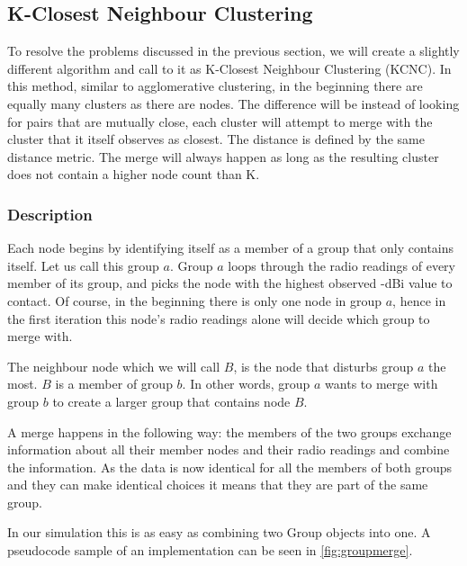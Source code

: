 \subsection{K-Closest Neighbour Clustering}
\label{chap:kcn}
To resolve the problems discussed in the previous section, we will create a slightly different algorithm and call to it as K-Closest Neighbour Clustering (KCNC). 
In this method, similar to agglomerative clustering, in the beginning there are equally many clusters as there are nodes. The difference will be instead of looking for pairs that are mutually close,
each cluster will attempt to merge with the cluster that it itself observes as closest. The distance is defined by the same distance metric. The merge will always happen as long as the resulting cluster does not contain a higher node count than K.

\subsubsection{Description}
Each node begins by identifying itself as a member of a group that only contains itself. Let us call this group $a$.
Group $a$ loops through the radio readings of every member of its group, and picks the node with the highest observed -dBi value
to contact. Of course, in the beginning there is only one node in group $a$, hence in the first iteration this node's radio readings alone will decide which group to merge with. 

The neighbour node which we will call $B$, is the node that disturbs group $a$ the most. $B$ is a member of group $b$.
In other words, group $a$ wants to merge with group $b$ to create a larger group that contains node $B$.

A merge happens in the following way: the members of the two groups exchange information about all their member nodes and their radio readings and combine the information.
As the data is now identical for all the members of both groups and they can make identical choices it means that they are part of the same group. 

In our simulation this is as easy as combining two Group objects into one. A pseudocode sample of an implementation can be seen in \ref{fig:groupmerge}.

